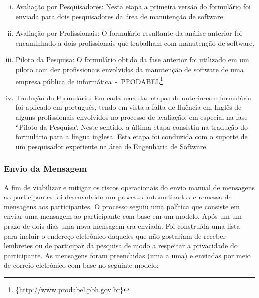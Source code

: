 \begin{enumerate}[(i)]
	\item Avaliação por Pesquisadores: Nesta etapa a primeira versão do
		formulário foi enviada para dois pesquisadores da área de manutenção de
		software.
	\item Avaliação por Profissionais: O formulário resultante da análise
		anterior foi encaminhado a dois profissionais que trabalham com
		manutenção de software.
	\item Piloto da Pesquisa: O formulário obtido da fase anterior foi utilizado
		em um piloto com dez profissionais envolvidos da manutenção de software
		de uma empresa pública de
		informática~-~PRODABEL\footnote{\url{{http://www.prodabel.pbh.gov.br}}}
	\item Tradução do Formulário: Em cada uma das etapas de anteriores o
		formulário foi aplicado em português, tendo em vista a falta de fluência
		em Inglês de alguns profissionais envolvidos no processo de avaliação,
		em especial na fase ``Piloto da Pesquisa'. Neste sentido, a última etapa
		consistiu na tradução do formulário para a língua inglesa. Esta etapa
		foi conduzida com  o suporte de um pesquisador experiente na área de
		Engenharia de Software.
\end{enumerate}

\subsubsection{Envio da Mensagem}
\label{subsubsub:envio_mensagem}

A fim de viabilizar e mitigar os riscos operacionais do envio manual de
mensagens ao participantes foi desenvolvido um processo automatizado de remessa
de mensagens aos participantes. O processo seguiu uma política que consiste em
enviar uma mensagem ao participante com base em um modelo. Após um um prazo de
dois dias uma nova mensagem era enviada. Foi construída uma lista para incluir o
endereço eletrônico daqueles que não gostariam de receber lembretes ou de
participar da pesquisa de modo a respeitar a privacidade do participante. As
mensagens foram preenchidas (uma a uma) e enviadas por meio de correio
eletrônico com base no seguinte modelo:

